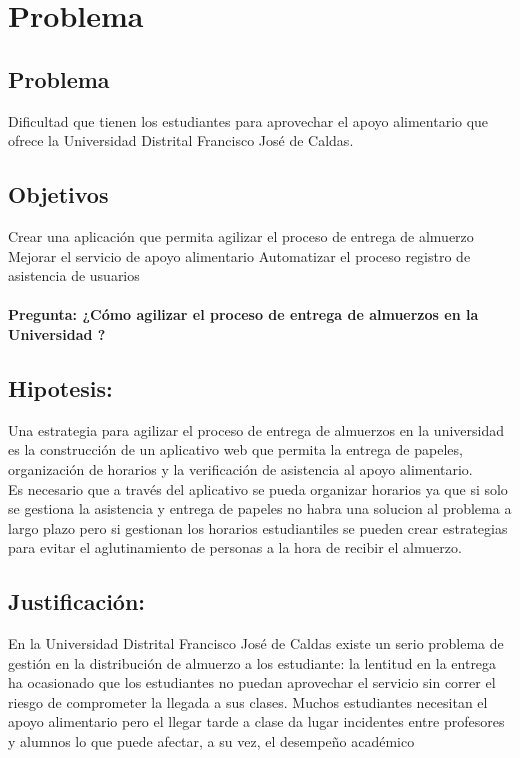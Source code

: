 \chapter{Problema}
\section{Problema}

Dificultad que tienen los estudiantes para aprovechar el apoyo alimentario que ofrece la Universidad Distrital Francisco José de Caldas.



\section{Objetivos}

Crear una aplicación que permita agilizar el proceso de entrega de almuerzo
Mejorar el servicio de apoyo alimentario 
Automatizar el proceso registro de asistencia de usuarios
\\
\\
\textbf{Pregunta: ¿Cómo agilizar el proceso de entrega de almuerzos en la Universidad ?}

\section{Hipotesis:}

Una estrategia para agilizar el proceso de entrega de almuerzos en la universidad es la construcción de un aplicativo web que permita la entrega de papeles, organización de horarios y la verificación de asistencia al apoyo alimentario.
\\
Es necesario que a través del aplicativo se pueda organizar horarios ya que si solo se gestiona la asistencia y entrega de papeles no habra una solucion al problema a largo plazo pero si gestionan los horarios estudiantiles se pueden crear estrategias para evitar el aglutinamiento de personas a la hora de recibir el almuerzo.
\\
\clearpage
\section{Justificación:}
En la Universidad Distrital Francisco José de Caldas existe un serio problema de gestión en la distribución de almuerzo a los estudiante:  la lentitud en la entrega ha ocasionado que los estudiantes no puedan aprovechar el servicio sin correr el riesgo de comprometer la llegada a sus clases. Muchos estudiantes necesitan el apoyo alimentario pero el llegar tarde a clase da lugar incidentes entre profesores y alumnos lo que  puede afectar, a su vez, el desempeño académico